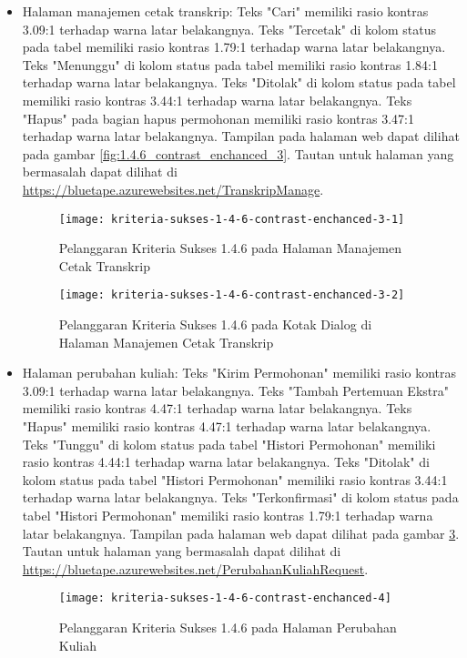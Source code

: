 \begin{itemize}
    \item Halaman manajemen cetak transkrip: Teks "Cari" memiliki rasio kontras 3.09:1 terhadap warna latar belakangnya. Teks "Tercetak" di kolom status pada tabel memiliki rasio kontras 1.79:1 terhadap warna latar belakangnya. Teks "Menunggu" di kolom status pada tabel memiliki rasio kontras 1.84:1 terhadap warna latar belakangnya. Teks "Ditolak" di kolom status pada tabel memiliki rasio kontras 3.44:1 terhadap warna latar belakangnya. Teks "Hapus" pada bagian hapus permohonan memiliki rasio kontras 3.47:1 terhadap warna latar belakangnya. Tampilan pada halaman web dapat dilihat pada gambar \ref{fig:1.4.6_contrast_enchanced_3}. Tautan untuk halaman yang bermasalah dapat dilihat di \url{https://bluetape.azurewebsites.net/TranskripManage}.
    \begin{figure}[H]
        \centering  
        \texttt{[image: kriteria-sukses-1-4-6-contrast-enchanced-3-1]}  
        \caption[Pelanggaran Kriteria Sukses 1.4.6 pada Halaman Manajemen Cetak Transkrip ]{Pelanggaran Kriteria Sukses 1.4.6 pada Halaman Manajemen Cetak Transkrip}
        \label{fig:1.4.6_contrast_enchanced_3_1}  
    \end{figure} 
    
    \begin{figure}[H]
        \centering  
        \texttt{[image: kriteria-sukses-1-4-6-contrast-enchanced-3-2]}  
        \caption[Pelanggaran Kriteria Sukses 1.4.6 pada Kotak Dialog di Halaman Manajemen Cetak Transkrip]{Pelanggaran Kriteria Sukses 1.4.6 pada Kotak Dialog di Halaman Manajemen Cetak Transkrip}
        \label{fig:1.4.6_contrast_enchanced_3_2}  
    \end{figure} 

    \item Halaman perubahan kuliah: Teks "Kirim Permohonan" memiliki rasio kontras 3.09:1 terhadap warna latar belakangnya. Teks "Tambah Pertemuan Ekstra" memiliki rasio kontras 4.47:1 terhadap warna latar belakangnya. Teks "Hapus" memiliki rasio kontras 4.47:1 terhadap warna latar belakangnya. Teks "Tunggu" di kolom status pada tabel "Histori Permohonan" memiliki rasio kontras 4.44:1 terhadap warna latar belakangnya. Teks "Ditolak" di kolom status pada tabel "Histori Permohonan" memiliki rasio kontras 3.44:1 terhadap warna latar belakangnya. Teks "Terkonfirmasi" di kolom status pada tabel "Histori Permohonan" memiliki rasio kontras 1.79:1 terhadap warna latar belakangnya. Tampilan pada halaman web dapat dilihat pada gambar \ref{fig:1.4.6_contrast_enchanced_4}. Tautan untuk halaman yang bermasalah dapat dilihat di \url{https://bluetape.azurewebsites.net/PerubahanKuliahRequest}.
    \begin{figure}[H]
        \centering  
        \texttt{[image: kriteria-sukses-1-4-6-contrast-enchanced-4]}  
        \caption[Pelanggaran Kriteria Sukses 1.4.6 pada Halaman Perubahan Kuliah]{Pelanggaran Kriteria Sukses 1.4.6 pada Halaman Perubahan Kuliah}
        \label{fig:1.4.6_contrast_enchanced_4}  
    \end{figure} 
    

\end{itemize}
